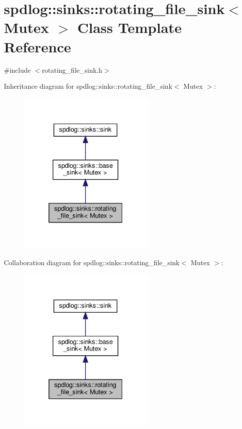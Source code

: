 \hypertarget{classspdlog_1_1sinks_1_1rotating__file__sink}{}\section{spdlog\+:\+:sinks\+:\+:rotating\+\_\+file\+\_\+sink$<$ Mutex $>$ Class Template Reference}
\label{classspdlog_1_1sinks_1_1rotating__file__sink}


{\ttfamily \#include $<$rotating\+\_\+file\+\_\+sink.\+h$>$}



Inheritance diagram for spdlog\+:\+:sinks\+:\+:rotating\+\_\+file\+\_\+sink$<$ Mutex $>$\+:
\nopagebreak
\begin{figure}[H]
\begin{center}
\leavevmode
\includegraphics[width=193pt]{classspdlog_1_1sinks_1_1rotating__file__sink__inherit__graph}
\end{center}
\end{figure}


Collaboration diagram for spdlog\+:\+:sinks\+:\+:rotating\+\_\+file\+\_\+sink$<$ Mutex $>$\+:
\nopagebreak
\begin{figure}[H]
\begin{center}
\leavevmode
\includegraphics[width=193pt]{classspdlog_1_1sinks_1_1rotating__file__sink__coll__graph}
\end{center}
\end{figure}
